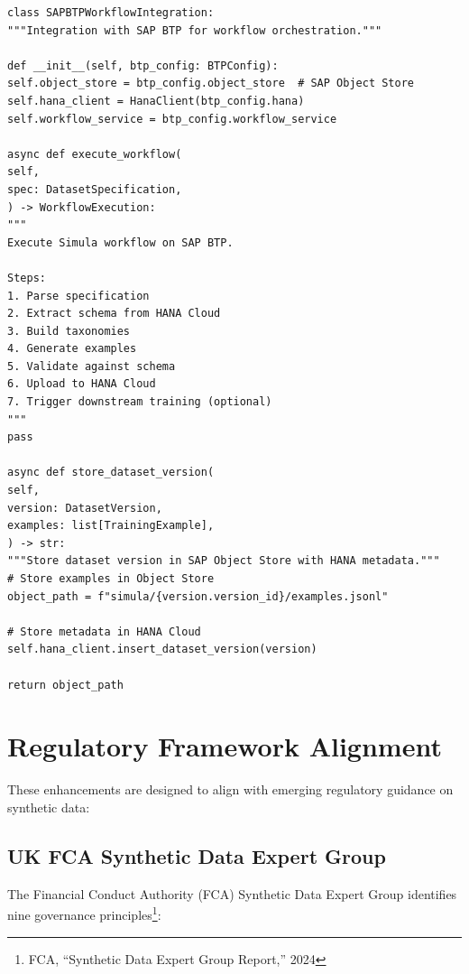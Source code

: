 \documentclass[12pt,a4paper,twoside]{report}
\begin{document}
\begin{lstlisting}[language=jsonx,caption={SAP BTP integration for workflow orchestration.}]
class SAPBTPWorkflowIntegration:
"""Integration with SAP BTP for workflow orchestration."""

def __init__(self, btp_config: BTPConfig):
self.object_store = btp_config.object_store  # SAP Object Store
self.hana_client = HanaClient(btp_config.hana)
self.workflow_service = btp_config.workflow_service

async def execute_workflow(
self,
spec: DatasetSpecification,
) -> WorkflowExecution:
"""
Execute Simula workflow on SAP BTP.

Steps:
1. Parse specification
2. Extract schema from HANA Cloud
3. Build taxonomies
4. Generate examples
5. Validate against schema
6. Upload to HANA Cloud
7. Trigger downstream training (optional)
"""
pass

async def store_dataset_version(
self,
version: DatasetVersion,
examples: list[TrainingExample],
) -> str:
"""Store dataset version in SAP Object Store with HANA metadata."""
# Store examples in Object Store
object_path = f"simula/{version.version_id}/examples.jsonl"

# Store metadata in HANA Cloud
self.hana_client.insert_dataset_version(version)

return object_path
\end{lstlisting}


\section{Regulatory Framework Alignment}

These enhancements are designed to align with emerging regulatory guidance on
synthetic data:

\subsection{UK FCA Synthetic Data Expert Group}

The Financial Conduct Authority (FCA) Synthetic Data Expert Group identifies
nine governance principles\footnote{FCA, ``Synthetic Data Expert Group Report,'' 2024}:
\end{document}
